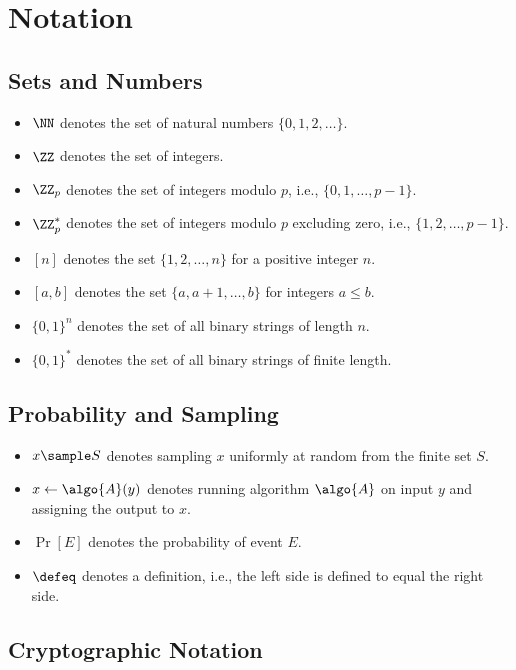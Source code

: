 \section{Notation}\label{sec:notation}

\subsection{Sets and Numbers}

\begin{itemize}
  \item $\NN$ denotes the set of natural numbers $\{0, 1, 2, \ldots\}$.
  \item $\ZZ$ denotes the set of integers.
  \item $\ZZ_p$ denotes the set of integers modulo $p$, i.e., $\{0, 1, \ldots, p-1\}$.
  \item $\ZZ_p^*$ denotes the set of integers modulo $p$ excluding zero, i.e., $\{1, 2, \ldots, p-1\}$.
  \item $[n]$ denotes the set $\{1, 2, \ldots, n\}$ for a positive integer $n$.
  \item $[a, b]$ denotes the set $\{a, a+1, \ldots, b\}$ for integers $a \leq b$.
  \item $\{0, 1\}^n$ denotes the set of all binary strings of length $n$.
  \item $\{0, 1\}^*$ denotes the set of all binary strings of finite length.
\end{itemize}

\subsection{Probability and Sampling}

\begin{itemize}
  \item $x \sample S$ denotes sampling $x$ uniformly at random from the finite set $S$.
  \item $x \gets \algo{A}(y)$ denotes running algorithm $\algo{A}$ on input $y$ and assigning the output to $x$.
  \item $\Pr[E]$ denotes the probability of event $E$.
  \item $\defeq$ denotes a definition, i.e., the left side is defined to equal the right side.
\end{itemize}

\subsection{Cryptographic Notation}

